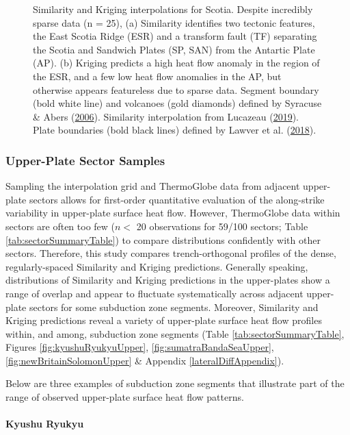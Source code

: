 \begin{figure}[htbp]
\caption[Similarity and Kriging interpolations for Scotia]{Similarity and Kriging interpolations for Scotia. Despite incredibly sparse data (n = 25), (a) Similarity identifies two tectonic features, the East Scotia Ridge (ESR) and a transform fault (TF) separating the Scotia and Sandwich Plates (SP, SAN) from the Antartic Plate (AP). (b) Kriging predicts a high heat flow anomaly in the region of the ESR, and a few low heat flow anomalies in the AP, but otherwise appears featureless due to sparse data. Segment boundary (bold white line) and volcanoes (gold diamonds) defined by Syracuse \& Abers (\protect\hyperlink{ref-syracuse2006}{2006}). Similarity interpolation from Lucazeau (\protect\hyperlink{ref-lucazeau2019}{2019}). Plate boundaries (bold black lines) defined by Lawver et al. (\protect\hyperlink{ref-lawver2018}{2018}).}\label{fig:scotiaDiff}
\end{figure}

\hypertarget{upSectorsResults}{%
\subsubsection{Upper-Plate Sector Samples}\label{upSectorsResults}}

Sampling the interpolation grid and ThermoGlobe data from adjacent upper-plate sectors allows for first-order quantitative evaluation of the along-strike variability in upper-plate surface heat flow. However, ThermoGlobe data within sectors are often too few (\(n <\) 20 observations for 59/100 sectors; Table \ref{tab:sectorSummaryTable}) to compare distributions confidently with other sectors. Therefore, this study compares trench-orthogonal profiles of the dense, regularly-spaced Similarity and Kriging predictions. Generally speaking, distributions of Similarity and Kriging predictions in the upper-plates show a range of overlap and appear to fluctuate systematically across adjacent upper-plate sectors for some subduction zone segments. Moreover, Similarity and Kriging predictions reveal a variety of upper-plate surface heat flow profiles within, and among, subduction zone segments (Table \ref{tab:sectorSummaryTable}, Figures \ref{fig:kyushuRyukyuUpper}, \ref{fig:sumatraBandaSeaUpper}, \ref{fig:newBritainSolomonUpper} \& Appendix \ref{lateralDiffAppendix}).

Below are three examples of subduction zone segments that illustrate part of the range of observed upper-plate surface heat flow patterns.

\hypertarget{kyushu-ryukyu-1}{%
\paragraph{Kyushu Ryukyu}\label{kyushu-ryukyu-1}}

